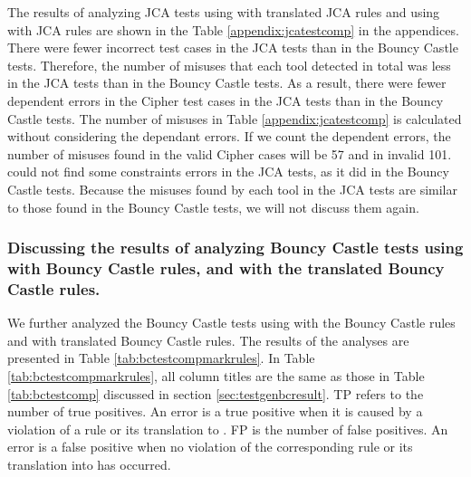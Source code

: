 The results of analyzing JCA tests using \codyze{} with translated JCA \MARK{} rules and using \cognicryptast{} with JCA \crysl{} rules are shown in the Table \ref{appendix:jcatestcomp} in the appendices. There were fewer incorrect test cases in the JCA tests than in the Bouncy Castle tests. Therefore, the number of misuses that each tool detected in total was less in the JCA tests than in the Bouncy Castle tests. As a result, there were fewer dependent errors in the Cipher test cases in the JCA tests than in the Bouncy Castle tests. The number of misuses in Table \ref{appendix:jcatestcomp} is calculated without considering the dependant errors. If we count the dependent errors, the number of misuses \cognicryptast{} found in the valid Cipher cases will be 57 and in invalid 101. \codyze{} could not find some constraints errors in the JCA tests, as it did in the Bouncy Castle tests. Because the misuses found by each tool in the JCA tests are similar to those found in the Bouncy Castle tests, we will not discuss them again.


\subsubsection{Discussing the results of analyzing Bouncy Castle tests using \codyze{} with Bouncy Castle \MARK{} rules, and \cognicryptsast{} with the translated Bouncy Castle \crysl{} rules.}
\label{sec:testgenmarkbcresult}
We further analyzed the Bouncy Castle tests using \codyze{} with the Bouncy Castle \MARK{} rules and \cognicryptsast{} with translated Bouncy Castle \MARK{} rules. The results of the analyses are presented in Table \ref{tab:bctestcompmarkrules}. In Table \ref{tab:bctestcompmarkrules}, all column titles are the same as those in Table \ref{tab:bctestcomp} discussed in section \ref{sec:testgenbcresult}. TP refers to the number of true positives. An error is a true positive when it is caused by a violation of a \MARK{} rule or its translation to \crysl. FP is the number of false positives. An error is a false positive when no violation of the corresponding \MARK{} rule or its translation into \crysl{} has occurred.

